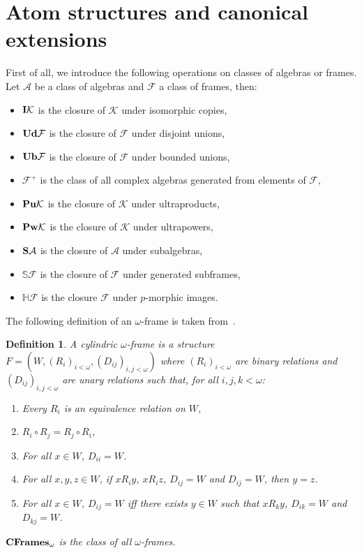 \documentclass{article}
\theoremstyle{defin}
\newtheorem{definition}{Definition}
\theoremstyle{theorem}
\theoremstyle{claim}
\theoremstyle{prop}
\theoremstyle{lemma}
\theoremstyle{fact}
\theoremstyle{remark}
\theoremstyle{ex}
\theoremstyle{col}
\theoremstyle{question}
\begin{document}
\section{Atom structures and canonical extensions}

First of all, we introduce the following operations on classes of algebras or frames. 
Let $\mathcal{A}$ be a class of algebras and $\mathcal{F}$ a class of frames, then:
\begin{itemize}
\item ${\bf I} \mathcal{K}$ is the closure of $\mathcal{K}$ under isomorphic copies,
\item ${\bf Ud} \mathcal{F}$ is the closure of $\mathcal{F}$ under disjoint unions,
\item ${\bf Ub} \mathcal{F}$ is the closure of $\mathcal{F}$ under bounded unions,
\item $\mathcal{F}^+$ is the class of all complex algebras generated from elements of $\mathcal{F}$,
\item ${\bf Pu} \mathcal{K}$ is the closure of $\mathcal{K}$ under ultraproducts,
\item ${\bf Pw} \mathcal{K}$ is the closure of $\mathcal{K}$ under ultrapowers,
\item ${\bf S} \mathcal{A}$ is the closure of $\mathcal{A}$ under subalgebras,
\item $\mathbb{S} \mathcal{F}$ is the closure of $\mathcal{F}$ under generated subframes,
\item $\mathbb{H} \mathcal{F}$ is the closure $\mathcal{F}$ under $p$-morphic images.
\end{itemize}

The following definition of an $\omega$-frame is taken from~\cite{Venema2013}.
\begin{definition}
  A cylindric $\omega$-frame is a structure $F = (W, {(R_i)}_{i < \omega}, {(D_{ij})}_{i, j < \omega})$ 
  where ${(R_i)}_{i < \omega}$ are binary relations and ${(D_{ij})}_{i, j < \omega}$ 
  are unary relations such that, for all $i, j, k < \omega$:
  \begin{enumerate}
  \item Every $R_i$ is an equivalence relation on $W$,
  \item $R_i \circ R_j = R_j \circ R_i$,
  \item For all $x \in W$, $D_{ii} = W$.
  \item For all $x, y, z \in W$, if $x R_i y$, $x R_i z$, $D_{ij} = W$ and $D_{ij} = W$, then $y = z$.
  \item For all $x \in W$, $D_{ij} = W$ iff there exists $y \in W$ such that $x R_k y$, $D_{ik} = W$ and $D_{kj} = W$.
  \end{enumerate}
  ${\bf CFrames}_{\omega}$ is the class of all $\omega$-frames.
\end{definition}
\end{document}
